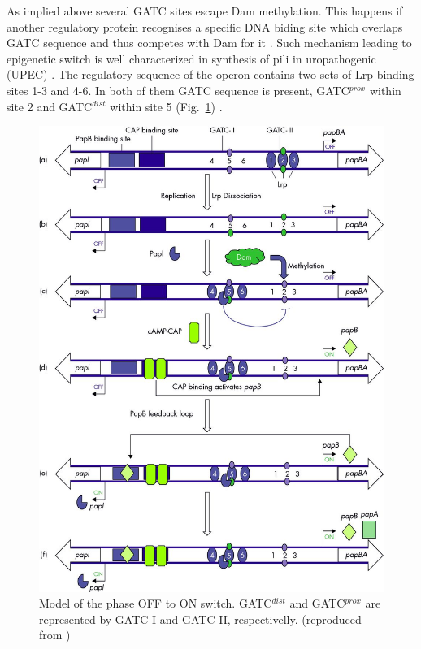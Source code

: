 As implied above several GATC sites escape Dam methylation.
This happens if another regulatory protein recognises a specific DNA biding site which overlaps GATC sequence and thus competes with Dam for it \cite{correnti2002dam}.
Such mechanism leading to epigenetic switch is well characterized in synthesis of  pili in uropathogenic  (UPEC) \cite{peterson2008competitive}.
The regulatory sequence of the  operon contains two sets of Lrp binding sites 1-3 and 4-6.
In both of them GATC sequence is present, GATC$^{prox}$ within site 2 and GATC$^{dist}$ within site 5 (Fig.~\ref{pap}) \cite{blyn1990regulation}.
\begin{figure}[t!]
  \centering
  \includegraphics[scale=1.5]{text/Pictures/papPili.jpeg}
	\caption{Model of the  phase OFF to ON switch. GATC$^{dist}$ and GATC$^{prox}$ are represented by GATC-I and GATC-II, respectivelly. (reproduced from \cite{adhikari2016dna})}
	\label{pap}
\end{figure}

